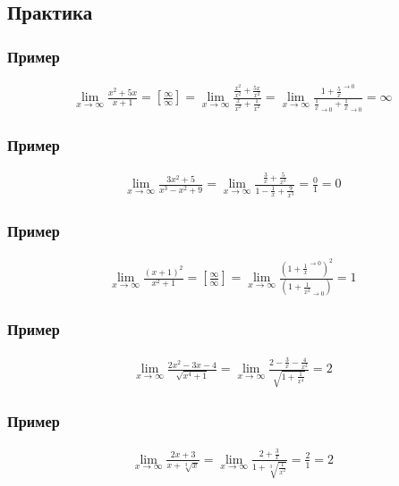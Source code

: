 \documentclass{article}
\begin{document}
\subsection{Практика}

\subsubsection{Пример}
\begin{gather*}
    \lim_{x \to \infty} \frac{x^2 + 5x}{x + 1} = 
    \left[ \frac{\infty}{\infty} \right] =
    \lim_{x \to \infty} \frac{\frac{x^2}{x^2} + \frac{5x}{x^2}}{\frac{x}{x^2} + \frac{1}{x^2}} =
    \lim_{x \to \infty} \frac{1 + \boxed{\frac{5}{x}}^{\to 0}}{\boxed{\frac{1}{x}}_{\to 0} + \boxed{\frac{1}{x}}_{\to 0}} = 
    \infty
\end{gather*}

\subsubsection{Пример}
\begin{gather*}
    \lim_{x \to \infty} \frac{3x^2 + 5}{x^3 - x^2 + 9} = 
    \lim_{x \to \infty} \frac{\frac{3}{x} + \frac{5}{x^3}}{1 - \frac{1}{x} + \frac{9}{x^3}} = 
    \frac{0}{1} = 0
\end{gather*}

\subsubsection{Пример}
\begin{gather*}
    \lim_{x \to \infty} \frac{(x + 1)^2}{x^2 + 1} = \left[ \frac{\infty}{\infty} \right] =
    \lim_{x \to \infty} \frac{\left( 1 + \boxed{\frac{1}{x}}^{\to 0} \right)^2}{\left( 1 + \boxed{\frac{1}{x^2}}_{\to 0} \right)} = 1
\end{gather*}

\subsubsection{Пример}
\begin{gather*}
    \lim_{x \to \infty} \frac{2x^2 - 3x - 4}{\sqrt{x^4 + 1}} =
    \lim_{x \to \infty} \frac{2 - \frac{3}{x} - \frac{4}{x^2}}{\sqrt{1 + \frac{1}{x^4}}} = 2
\end{gather*}

\subsubsection{Пример}
\begin{gather*}
    \lim_{x \to \infty} \frac{2x + 3}{x + \sqrt[3]{x}} =
    \lim_{x \to \infty} \frac{2 + \frac{3}{x}}{1 + \sqrt[3]{\frac{1}{x^2}}} = \frac{2}{1} = 2
\end{gather*}
\end{document}
